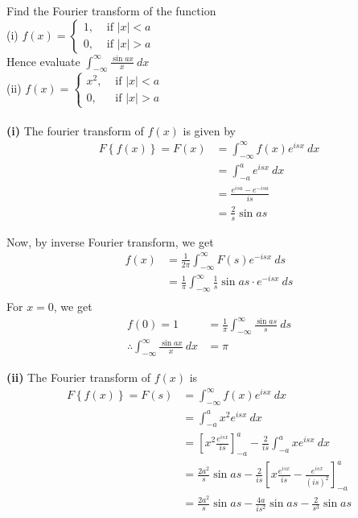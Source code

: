 \documentclass[12pt]{article}
\numberwithin{equation}{subsection}
\begin{document}
\begin{example}{
        Find the Fourier transform of the function \\
        (i) $\displaystyle f(x) = 
        \begin{cases}
            1, &\text{ if } |x|<a \\
            0, &\text{ if } |x|>a
        \end{cases}$ \\
        Hence evaluate $\displaystyle \int_{-\infty}^{\infty} {\frac{\sin{ax}}{x}} \: d{x}$ \\
        (ii) $\displaystyle f(x) =
        \begin{cases}
            x^2, &\text{ if } |x|<a \\
            0, &\text{ if } |x|>a
        \end{cases}$ \\~\\
    }{}
    \textbf{(i)} The fourier transform of $f(x)$ is given by
    \begin{align*}
        F \left\{ f(x) \right\} = F(x) &= \int_{-\infty}^{\infty} {f(x) e^{isx}} \: d{x} \\
        &= \int_{-a}^{a} {e^{isx}} \: d{x} \\
        &= \frac{e^{isa} - e^{-isa}}{is} \\
        &= \frac{2}{s} \sin{as}
    \end{align*}

    Now, by inverse Fourier transform, we get
    \begin{align*}
        f(x) &= \frac{1}{2\pi} \int_{-\infty}^{\infty} {F(s)e^{-isx}} \: d{s} \\
        &= \frac{1}{\pi} \int_{-\infty}^{\infty} { \frac{1}{s} \sin{as} \cdot e^{-isx} } \: d{s} \\
    \end{align*}
    For $x = 0$, we get
    \begin{align*}
        f(0) = 1 &= \frac{1}{\pi} \int_{-\infty}^{\infty} {\frac{\sin{as}}{s}} \: d{s} \\
        \therefore \int_{-\infty}^{\infty} {\frac{\sin{ax}}{x}} \: d{x} &= \pi
    \end{align*}

    \textbf{(ii)} The Fourier transform of $f(x)$ is
     \begin{align*}
        F \left\{ f(x) \right\} = F(s) &= \int_{-\infty}^{\infty} {f(x) e^{isx}} \: d{x} \\
        &= \int_{-a}^{a} {x^2e^{isx}} \: d{x} \\
        &= \left[ x^2 \frac{e^{isx}}{is} \right]_{-a}^{a} - \frac{2}{is} \int_{-a}^{a} {x e^{isx}} \: d{x} \\
        &= \frac{2a^2}{s}\sin{as} - \frac{2}{is} \left[ x \frac{e^{isx}}{is} - \frac{e^{isx}}{(is)^2} \right]_{-a}^{a} \\
        &= \frac{2a^2}{s}\sin{as} - \frac{4a}{is^2}\sin{as} - \frac{2}{s^3}\sin{as}
    \end{align*}

\end{example}
\end{document}
